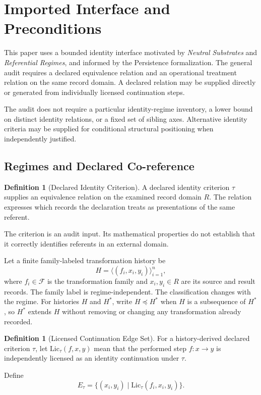 \documentclass[11pt]{article}
\theoremstyle{plain}
\theoremstyle{definition}
\newtheorem{definition}[theorem]{Definition}
\theoremstyle{remark}
\newcommand{\Lic}{\ensuremath{\mathrm{Lic}}}
\newcommand{\Fset}{\ensuremath{\mathcal{F}}}
\begin{document}
\section{Imported Interface and Preconditions}
\label{oi.sec.interface}

This paper uses a bounded identity interface motivated by
\emph{Neutral Substrates} and \emph{Referential Regimes},
and informed by the Persistence formalization.
The general audit requires a declared equivalence relation
and an operational treatment relation on the same record domain.
A declared relation may be supplied directly or generated
from individually licensed continuation steps.

The audit does not require a particular identity-regime inventory,
a lower bound on distinct identity relations,
or a fixed set of sibling axes.
Alternative identity criteria may be supplied for conditional
structural positioning when independently justified.

\subsection{Regimes and Declared Co-reference}

\begin{definition}[Declared Identity Criterion]
  \label{oi.def.regime}
  A declared identity criterion \(\tau\) supplies an
  equivalence relation on the examined record domain \(R\).
  The relation expresses which records the declaration
  treats as presentations of the same referent.

  The criterion is an audit input.
  Its mathematical properties do not establish that
  it correctly identifies referents in an external domain.
\end{definition}

Let a finite family-labeled transformation history be
\[
  H=\langle(f_i,x_i,y_i)\rangle_{i=1}^{n},
\]
where \(f_i\in\Fset\) is the transformation family
and \(x_i,y_i\in R\) are its source and result records.
The family label is regime-independent.
The classification changes with the regime.
For histories \(H\) and \(H^{\ast}\), write \(H\preceq H^{\ast}\)
when \(H\) is a subsequence of \(H^{\ast}\),
so \(H^{\ast}\) extends \(H\) without removing or changing
any transformation already recorded.

\begin{definition}[Licensed Continuation Edge Set]
  \label{oi.def.nonbreaking}
  For a history-derived declared criterion \(\tau\), let
  \(\Lic_{\tau}(f,x,y)\) mean that the performed step
  \(f:x\to y\) is independently licensed as an identity
  continuation under \(\tau\).

  Define
  \[
    E_{\tau}
    =
    \{
    (x_i,y_i)
    \mid
    \Lic_{\tau}(f_i,x_i,y_i)
    \}.
  \]
\end{definition}
\end{document}
